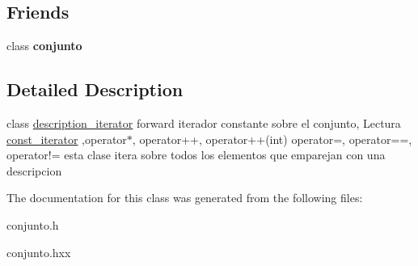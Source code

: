 \subsection*{Friends}
\begin{DoxyCompactItemize}
\item 
\hypertarget{classconjunto_1_1description__iterator_a3d79521e8bdd4a7fcb97da3f383fe5da}{}class {\bfseries conjunto}\label{classconjunto_1_1description__iterator_a3d79521e8bdd4a7fcb97da3f383fe5da}

\end{DoxyCompactItemize}


\subsection{Detailed Description}
class \hyperlink{classconjunto_1_1description__iterator}{description\+\_\+iterator} forward iterador constante sobre el conjunto, Lectura \hyperlink{classconjunto_1_1const__iterator}{const\+\_\+iterator} ,operator$\ast$, operator++, operator++(int) operator=, operator==, operator!= esta clase itera sobre todos los elementos que emparejan con una descripcion 

The documentation for this class was generated from the following files\+:\begin{DoxyCompactItemize}
\item 
conjunto.\+h\item 
conjunto.\+hxx\end{DoxyCompactItemize}
